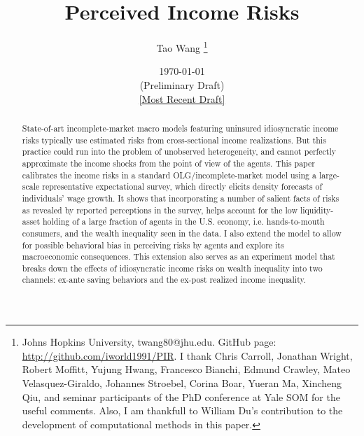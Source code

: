 \begin{titlepage}
 \title{Perceived Income Risks}
 
 \author{Tao Wang \thanks{Johns Hopkins University, twang80@jhu.edu. GitHub page: \url{http://github.com/iworld1991/PIR}. I thank Chris Carroll, Jonathan Wright, Robert Moffitt, Yujung Hwang, Francesco Bianchi, Edmund Crawley, Mateo Velasquez-Giraldo, Johannes Stroebel, Corina Boar, Yueran Ma, Xincheng Qiu, and seminar participants of the PhD conference at Yale SOM for the useful comments. Also, I am thankfull to William Du's contribution to the development of computational methods in this paper.}}

\date{\today \\(Preliminary Draft) \\\href{https://github.com/iworld1991/PIR/blob/master/PIR.pdf}{[Most Recent Draft]}}
	\maketitle
	\begin{abstract}
	\begin{singlespace}
		\noindent State-of-art incomplete-market macro models featuring uninsured idiosyncratic income risks typically use estimated risks from cross-sectional income realizations. But this practice could run into the problem of unobserved heterogeneity, and cannot perfectly approximate the income shocks from the point of view of the agents. This paper calibrates the income risks in a standard OLG/incomplete-market model using a large-scale representative expectational survey, which directly elicits density forecasts of individuals' wage growth. It shows that incorporating a number of salient facts of risks as revealed by reported perceptions in the survey, helps account for the low liquidity-asset holding of a large fraction of agents in the U.S. economy, i.e. hands-to-mouth consumers, and the wealth inequality seen in the data. I also extend the model to allow for possible behavioral bias in perceiving risks by agents and explore its macroeconomic consequences. This extension also serves as an experiment model that breaks down the effects of idiosyncratic income risks on wealth inequality into two channels: ex-ante saving behaviors and the ex-post realized income inequality.
		

\end{singlespace}
\end{abstract}
\end{titlepage}
